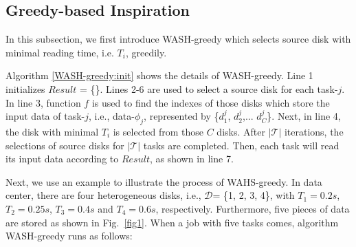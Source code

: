 \documentclass[conference]{IEEEtran}
\begin{document}
\subsection{Greedy-based Inspiration}\label{Heuristic}
In this subsection, we first introduce WASH-greedy which selects source disk with minimal reading time, i.e. $T_i$, greedily.

Algorithm \ref{WASH-greedy:init} shows the details of WASH-greedy. Line 1 initializes $Result$ = \{\}. Lines 2-6 are used to select a source disk for each task-$j$. In line 3, function $f$ is used to find the indexes of those disks which store the input data of task-$j$, i.e., data-$\phi_j$, represented by \{$d_{1}^j$, $d_{2}^j$,... $d_{C}^j$\}. Next, in line 4, the disk with minimal $T_i$ is selected from those $C$ disks. After $\mathcal{|T|}$ iterations, the selections of source disks for $\mathcal{|T|}$ tasks are completed. Then, each task will read its input data according to $Result$, as shown in line 7.



Next, we use an example to illustrate the process of WAHS-greedy. In data center, there are four heterogeneous disks, i.e., $\mathcal{D}$= \{1, 2, 3, 4\}, with $T_1 = 0.2s$,  $T_2 = 0.25s$,  $T_3 = 0.4s$ and $T_4 = 0.6s$, respectively. Furthermore, five pieces of data are stored as shown in Fig.~\ref{fig1}. When a job with five tasks comes, algorithm WASH-greedy runs as follows: %
\end{document}
